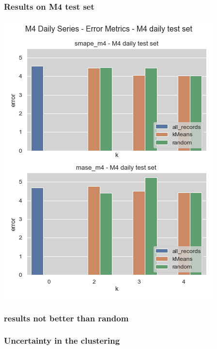 \documentclass[11pt]{article}
\begin{document}
\subsubsection*{Results on M4 test set}
\label{sec:orgfeee714}
\begin{center}
\includegraphics[width=.9\linewidth]{../img/daily_m4_results.png}
\end{center}
\subsubsection*{}
\label{sec:org1c83b2e}
\subsubsection*{results not better than random}
\label{sec:orgc25adc4}
\subsubsection*{Uncertainty in the clustering}
\label{sec:org41c56d2}
\subsubsection*{}
\label{sec:orgd25c4cf}
\end{document}
